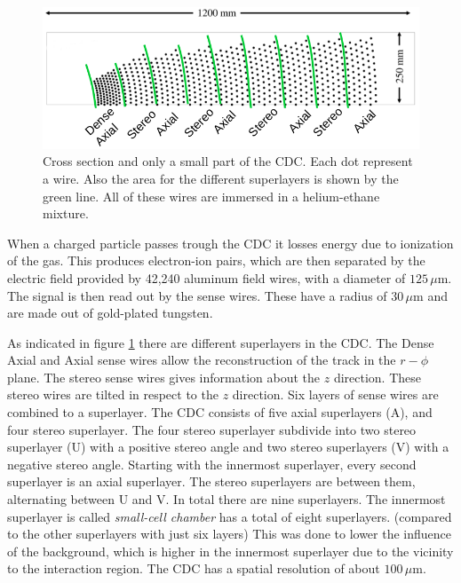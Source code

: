 \documentclass[a4paper,11pt,twosided,final,german,openbib,pdftex,listof=totoc,bibliography=totoc]{scrbook}
\begin{document}
\begin{figure}[h!] 
	\centering
	\includegraphics[width=\textwidth]{Bilder/CDC}
	\caption[Central Drift Chamber]{Cross section and only a small part of the CDC. Each dot represent a wire. Also the area for the different superlayers is shown by the green line. All of these wires are immersed in a helium-ethane mixture.\cite{CDCHauth}}
	\label{fig:CDC}
\end{figure}

When a charged particle passes trough the CDC it losses energy due to ionization of the gas. This produces electron-ion pairs, which are then separated by the electric field provided by 42,240 aluminum field wires, with a diameter of $125\,\mu\textrm{m}$. The signal is then read out by the sense wires. These have a radius of $30\,\mu\textrm{m}$ and are made out of gold-plated tungsten.\cite{B2TR} 

As indicated in figure \ref{fig:CDC} there are different superlayers in the CDC. The Dense Axial and Axial sense wires allow the reconstruction of the track in the $r-\phi$ plane. The stereo sense wires gives information about the $z$ direction. These stereo wires are tilted in respect to the $z$ direction. Six layers of sense wires are combined to a superlayer. The CDC consists of five axial superlayers (A), and four stereo superlayer. The four stereo superlayer subdivide into two stereo superlayer (U) with a positive stereo angle and two stereo superlayers (V) with a negative stereo angle. Starting with the innermost superlayer, every second superlayer is an axial superlayer. The stereo superlayers are between them, alternating between U and V. In total there are nine superlayers. The innermost superlayer is called \textit{small-cell chamber} has a total of eight superlayers. (compared to the other superlayers with just six layers) This was done to lower the influence of the background, which is higher in the innermost superlayer due to the vicinity to the interaction region.
The CDC has a spatial resolution of about $100\,\mu\textrm{m}$.\cite{B2TR}
\end{document}
